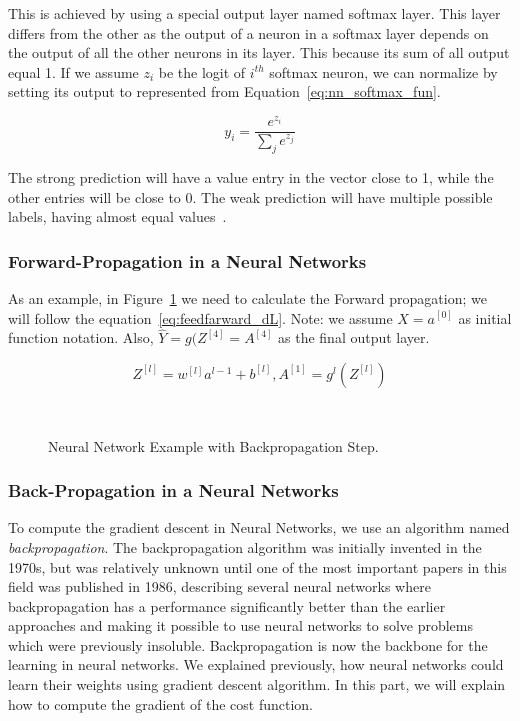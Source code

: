 This is achieved by using a special output layer named softmax layer. This layer differs from the other as the output of a neuron in a softmax layer depends on the output of all the other neurons in its layer. This because its sum of all output equal 1. If we assume $z_i$ be the logit of $i^{th}$ softmax neuron, we can normalize by setting its output to represented from Equation~\eqref{eq:nn_softmax_fun}.

\begin{equation}\label{eq:nn_softmax_fun}
 y_i=\frac{e^{z_i}}{\sum_je^{z_j}}
\end{equation}

The strong prediction will have a value entry in the vector close to 1, while the other entries will be close to 0. The weak prediction will have multiple possible labels, having almost equal values~\cite{DLFundamentals}.

\subsubsection{Forward-Propagation in a Neural Networks}

As an example, in Figure~\ref{Fig:NN_With_BP} we need to calculate the Forward propagation; we will follow the equation~\eqref{eq:feedfarward_dL}. Note: we assume $X = a^{[0]}$ as initial function notation. Also, $\widehat{Y}= g(Z^{[4]}=A^{[4]}$ as the final output layer.

\begin{equation}\label{eq:feedfarward_dL}
Z^{[l]} = w^{[l]} a^{l-1} + b^{[l]} , A^{[1]} = g^{l}(Z^{[l]})
\end{equation} %

\begin{figure}[t]

\caption{Neural Network Example with Backpropagation Step.}~\label{Fig:NN_With_BP}
\end{figure}%

\subsubsection{Back-Propagation in a Neural Networks}

To compute the gradient descent in Neural Networks, we use an algorithm named \textit{backpropagation}. The backpropagation algorithm was initially invented in the 1970s, but was relatively unknown until one of the most important papers in this field was published in 1986, describing several neural networks where backpropagation has a performance significantly better than the earlier approaches and making it possible to use neural networks to solve problems which were previously insoluble. Backpropagation is now the backbone for the learning in neural networks.
We explained previously, how neural networks could learn their weights using gradient descent algorithm. In this part, we will explain how to compute the gradient of the cost function.

